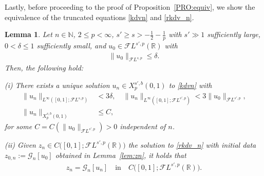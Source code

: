 \documentclass[a4paper,
11pt,  reqno]{amsart}
\newcommand{\5}{\textup{V}}
\newcommand{\noi}{\noindent}
\newcommand{\FL}{\mathcal{F} L}
\newcommand{\dl}{\delta}
\newtheorem{lemma}[theorem]{Lemma}
\theoremstyle{remark}
\newcommand{\R}{\mathbb{R}}
\newcommand{\N}{\mathbb{N}}
\newcommand{\Gc}{\mathcal{G}}
\numberwithin{equation}{section}
\numberwithin{theorem}{section}
\begin{document}
Lastly, before proceeding to the proof of Proposition~\ref{PRO:equiv}, we show the equivalence of the truncated equations \eqref{kdvn} and \eqref{rkdv_n}.



\begin{lemma}\label{lem:equiv_n}
Let $n\in\N$, $2 \le p < \infty$, $s'\ge s> - \frac12 - \frac1p$ with $s'\gg1$ sufficiently large, $0< \dl \le 1$ sufficiently small, and $u_0 \in \FL^{s',p}(\R)$ with
\begin{align}
\| u_0 \|_{\FL^{s,p}} \le \dl.
\end{align}
Then, the following hold:

\noi
{\rm(i)}
There exists a unique solution $u_n \in X^{s', b}_p(0,1)$ to \eqref{kdvn} with
\begin{align}
\label{eq:bounds_unif_u}
		\|u_n\|_{L^\infty([0,1];\FL^{s,p})}&
<3 \delta,
\quad 	\|u_n\|_{L^\infty([0,1]; \FL^{s',p})}
<3\|u_0\|_{\FL^{s',p}},
\\
\| u_n\|_{X^{s, b}_p(0,1)} & \le C,
\label{eq:bound_Xsb}
\end{align}
for some $C=C(\|u_0\|_{\FL^{s',p}})>0$ independent of $n$.

\noi
{\rm(ii)} Given $z_n \in C\big([0,1]; \FL^{s',p}(\R)\big)$ the solution to \eqref{rkdv_n} with initial data $z_{0,n} := \Gc_n[u_0]$ obtained in Lemma~\ref{lem:zn}, it holds that
\begin{align}
\label{eq:equivn}
z_ n = \Gc_n [u_n]
\quad
\text{in}
\quad
C\big([0,1] ; \FL^{s',p}(\R)\big)
.
\end{align}

\end{lemma}
\end{document}

